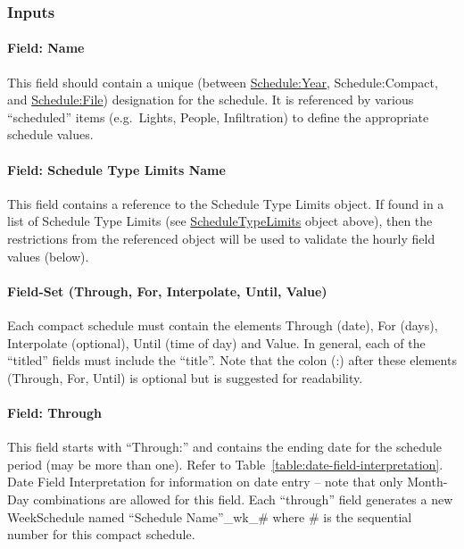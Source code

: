 \subsubsection{Inputs}\label{inputs-7-023}

\paragraph{Field: Name}\label{field-name-6-019}

This field should contain a unique (between \hyperref[scheduleyear]{Schedule:Year}, Schedule:Compact, and \hyperref[schedulefile]{Schedule:File}) designation for the schedule. It is referenced by various ``scheduled'' items (e.g.~Lights, People, Infiltration) to define the appropriate schedule values.

\paragraph{Field: Schedule Type Limits Name}\label{field-schedule-type-limits-name-4}

This field contains a reference to the Schedule Type Limits object. If found in a list of Schedule Type Limits (see \hyperref[scheduletypelimits]{ScheduleTypeLimits} object above), then the restrictions from the referenced object will be used to validate the hourly field values (below).

\paragraph{Field-Set (Through, For, Interpolate, Until, Value)}\label{field-set-through-for-interpolate-until-value}

Each compact schedule must contain the elements Through (date), For (days), Interpolate (optional), Until (time of day) and Value. In general, each of the ``titled'' fields must include the ``title''. Note that the colon (:) after these elements (Through, For, Until) is optional but is suggested for readability.

\paragraph{Field: Through}\label{field-through}

This field starts with ``Through:'' and contains the ending date for the schedule period (may be more than one). Refer to Table~\ref{table:date-field-interpretation}. Date Field Interpretation for information on date entry -- note that only Month-Day combinations are allowed for this field. Each ``through'' field generates a new WeekSchedule named ``Schedule Name''\_wk\_\# where \# is the sequential number for this compact schedule.

